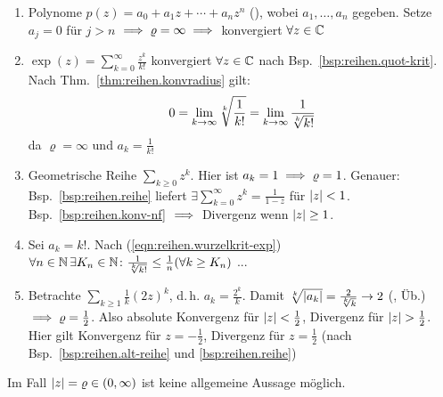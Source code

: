 \documentclass[12pt]{scrreprt}
\begin{document}
\begin{bsp}\label{bsp:reihen.konvradius}
\begin{enumerate}
\item Polynome $p(z) = a_0 + a_1z + \dotsb + a_nz^n$ (), wobei $a_1, \dotsc, a_n$ gegeben.
Setze $a_j = 0$ für $j > n$ $\implies \varrho = \infty \implies$ konvergiert $\forall z\in\mathbb{C}$

\item $\exp(z) = \sum_{k=0}^\infty \frac{z^k}{k!}$ konvergiert $\forall z\in\mathbb{C}$ nach Bsp.~\ref{bsp:reihen.quot-krit}.
Nach Thm.~\ref{thm:reihen.konvradius} gilt: 
\begin{equation}\label{eqn:reihen.wurzelkrit-exp}
0 = \lim_{k\rightarrow\infty} \sqrt[k]{\frac{1}{k!}} = \lim_{k\rightarrow\infty} \frac{1}{\sqrt[k]{k!}}
\end{equation}
da $\varrho = \infty$ und $a_k = \frac{1}{k!}$

\item Geometrische Reihe $\sum_{k \ge 0} z^k$. Hier ist $a_k = 1 \implies \varrho = 1$. Genauer: Bsp.~\ref{bsp:reihen.reihe}
liefert $\exists \sum_{k=0}^\infty z^k = \frac{1}{1-z}$ für $\left\lvert z\right\lvert < 1$. Bsp.~\ref{bsp:reihen.konv-nf} $\implies$ Divergenz
wenn $\left\lvert z\right\lvert \ge 1$.

\item Sei $a_k = k!$. Nach (\ref{eqn:reihen.wurzelkrit-exp}) $\forall n\in\mathbb{N}\,\exists K_n\in\mathbb{N}\colon \frac{1}{\sqrt[k]{k!}} \le \frac{1}{n} 
(\forall k \ge K_n)$ ...

\item Betrachte $\sum_{k \ge 1} \frac{1}{k} (2z)^k$, d.\,h. $a_k = \frac{2^k}{k}$. 
Damit $\sqrt[k]{\left\lvert a_k\right\lvert} = \frac{2}{\sqrt[k]{k}} \rightarrow 2$ (\kinf, Üb.)
$\implies \varrho = \frac{1}{2}$. Also absolute Konvergenz für $\left\lvert z\right\lvert < \frac{1}{2}$, Divergenz für $\left\lvert z\right\lvert > \frac{1}{2}$.
Hier gilt Konvergenz für $z = -\frac{1}{2}$, Divergenz für $z = \frac{1}{2}$ (nach Bsp.~\ref{bsp:reihen.alt-reihe} und 
\ref{bsp:reihen.reihe})
\end{enumerate}
\end{bsp}

\begin{bem*}
Im Fall $\left\lvert z\right\lvert = \varrho \in (0, \infty)$ ist keine allgemeine Aussage möglich.
\end{bem*}
\end{document}
